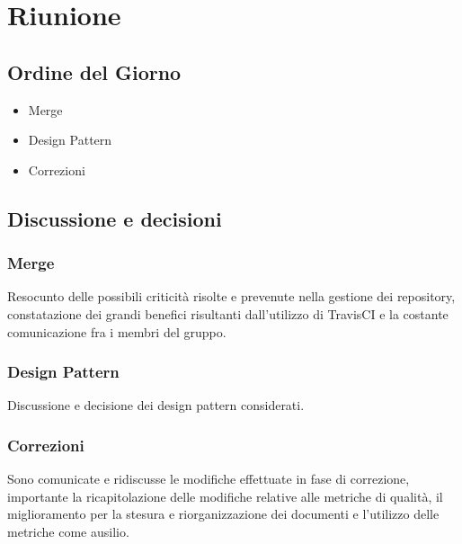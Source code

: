 \section{Riunione}
\subsection{Ordine del Giorno}
\begin{itemize}
	\item Merge
	\item Design Pattern
	\item Correzioni
\end{itemize}

\subsection{Discussione e decisioni}

\subsubsection{Merge}
Resocunto delle possibili criticità risolte e prevenute nella gestione dei repository, constatazione dei grandi benefici risultanti dall'utilizzo di TravisCI e la costante comunicazione fra i membri del gruppo.

\subsubsection{Design Pattern}
Discussione e decisione dei design pattern considerati.

\subsubsection{Correzioni}
Sono comunicate e ridiscusse le modifiche effettuate in fase di correzione, importante la ricapitolazione delle modifiche relative alle metriche di qualità, il miglioramento per la stesura e riorganizzazione dei documenti e l'utilizzo delle metriche come ausilio.


\clearpage
